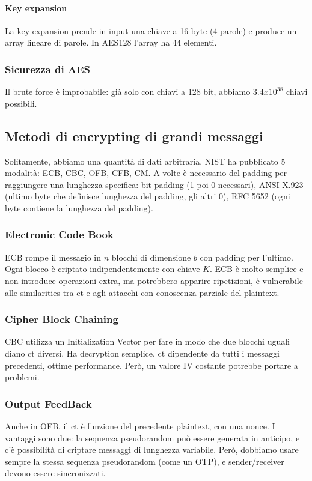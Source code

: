 \documentclass[11pt]{article}
\begin{document}
\paragraph{Key expansion} La key expansion prende in input una chiave a 16 byte (4 parole) e produce un array lineare di parole. In AES128 l'array ha 44 elementi. 

\subsubsection{Sicurezza di AES}
Il brute force è improbabile: già solo con chiavi a 128 bit, abbiamo $3.4 x 10^38$ chiavi possibili. 
\subsection{Metodi di encrypting di grandi messaggi}
Solitamente, abbiamo una quantità di dati arbitraria. NIST ha pubblicato 5 modalità: ECB, CBC, OFB, CFB, CM. A volte è necessario del padding per raggiungere una lunghezza specifica: bit padding (1 poi 0 necessari), ANSI X.923 (ultimo byte che definisce lunghezza del padding, gli altri 0), RFC 5652 (ogni byte contiene la lunghezza del padding). 
\subsubsection{Electronic Code Book}
ECB rompe il messagio in $n$ blocchi di dimensione $b$ con padding per l'ultimo. Ogni blocco è criptato indipendentemente con chiave $K$. ECB è molto semplice e non introduce operazioni extra, ma potrebbero apparire ripetizioni, è vulnerabile alle similarities tra ct e agli attacchi con conoscenza parziale del plaintext.
\subsubsection{Cipher Block Chaining}
CBC utilizza un Initialization Vector per fare in modo che due blocchi uguali diano ct diversi. Ha decryption semplice, ct dipendente da tutti i messaggi precedenti, ottime performance. Però, un valore IV costante potrebbe portare a problemi.
\subsubsection{Output FeedBack}
Anche in OFB, il ct è funzione del precedente plaintext, con una nonce. I vantaggi sono due: la sequenza pseudorandom può essere generata in anticipo, e c'è possibilità di criptare messaggi di lunghezza variabile. Però, dobbiamo usare sempre la stessa sequenza pseudorandom (come un OTP), e sender/receiver devono essere sincronizzati. 
\end{document}
